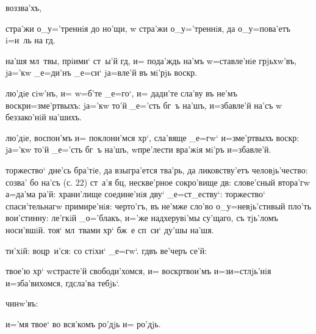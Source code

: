 
  воззва'хъ, 

 стра'жи о_у='треннiя до но'щи, w\т 
стра'жи о_у='треннiя, да о_у=пова'етъ i=и~ль на гд.

 на'шя мл~твы, прiими` ст~ы'й гд, и= 
пода'ждь на'мъ w=ставле'нiе грjьхw'въ, jа='кw _е=ди'нъ 
_е=си` jа=вле'й въ мi'рjь воскр.

 лю'дiе сiw'нъ, и= w=б'те _е=го`, и= 
дади'те сла'ву въ не'мъ воскр и=з\ъ ме'ртвыхъ: 
jа='кw то'й _е='сть бг~ъ на'шъ, и=збавле'й на'съ w\т 
беззако'нiй на'шихъ.

 лю'дiе, воспои'мъ и= поклони'мся хр`, 
сла'вяще _е=гw` и=з\ъ ме'ртвыхъ воскр: jа='кw то'й 
_е='сть бг~ъ на'шъ, w\т пре'лести вра'жiя мi'ръ 
и=збавле'й.


 торжество` дне'сь бра'тiе, да взыгра'ется 
тва'рь, да ликовству'етъ человjь'чество: созва' бо на'съ 
(с. 22) ст~а'я бц, нескве'рное сокро'вище дв: 
слове'сный втора'гw а=да'ма ра'й: храни'лище соедине'нiя 
дву` _е=ст_еству`: торжество` спаси'тельнагw примире'нiя: 
черто'гъ, въ не'мже сло'во о_у=невjь'стивый пло'ть 
вои'стинну: ле'гкiй _о='блакъ, и='же над\ъ херувi'мы 
су'щаго, съ тjь'ломъ носи'вшiй. тоя` мл~твами хр` 
бж~е сп~си` ду'шы на'шя.

  ти'хiй:   
воцр~и'ся: со стiхи` _е=гw`.    гд въ 
ве'черъ се'й: 

 твое'ю хр` w\т страсте'й свободи'хомся, 
и= воскр твои'мъ и=з\ъ и=стлjь'нiя и=зба'вихомся, 
гд сла'ва тебjь`.

       чинw'въ:

  и='мя твое` во вся'комъ ро'дjь и= 
ро'дjь.

